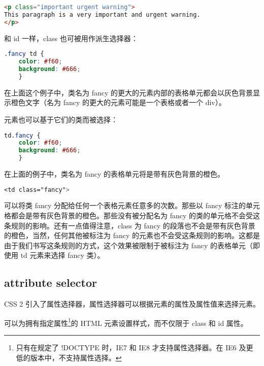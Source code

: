 \begin{lstlisting}[language=HTML]
<p class="important urgent warning">
This paragraph is a very important and urgent warning.
</p>
\end{lstlisting}

和 id 一样，class 也可被用作派生选择器：

\begin{lstlisting}[language=CSS]
.fancy td {
	color: #f60;
	background: #666;
	}
\end{lstlisting}


在上面这个例子中，类名为 fancy 的更大的元素内部的表格单元都会以灰色背景显示橙色文字（名为 fancy 的更大的元素可能是一个表格或者一个 div）。

元素也可以基于它们的类而被选择：

\begin{lstlisting}[language=CSS]
td.fancy {
	color: #f60;
	background: #666;
	}
\end{lstlisting}

在上面的例子中，类名为 fancy 的表格单元将是带有灰色背景的橙色。

\begin{lstlisting}[language=CSS]
<td class="fancy">
\end{lstlisting}

可以将类 fancy 分配给任何一个表格元素任意多的次数。那些以 fancy 标注的单元格都会是带有灰色背景的橙色。那些没有被分配名为 fancy 的类的单元格不会受这条规则的影响。还有一点值得注意，class 为 fancy 的段落也不会是带有灰色背景的橙色，当然，任何其他被标注为 fancy 的元素也不会受这条规则的影响。这都是由于我们书写这条规则的方式，这个效果被限制于被标注为 fancy 的表格单元（即使用 td 元素来选择 fancy 类）。


\subsection{attribute selector}


CSS 2 引入了属性选择器，属性选择器可以根据元素的属性及属性值来选择元素。

可以为拥有指定属性\footnote{只有在规定了 !DOCTYPE 时，IE7 和 IE8 才支持属性选择器。在 IE6 及更低的版本中，不支持属性选择。}的 HTML 元素设置样式，而不仅限于 class 和 id 属性。


